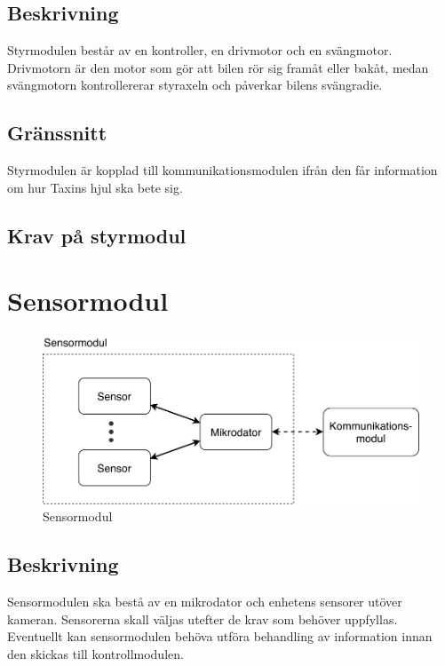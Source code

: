 \documentclass[kravspec/krav.tex]{subfiles}
\begin{document}
\subsection{Beskrivning}
Styrmodulen består av en kontroller, en drivmotor och en svängmotor. Drivmotorn
är den motor som gör att bilen rör sig framåt eller bakåt, medan svängmotorn
kontrollererar styraxeln och påverkar bilens svängradie.

\subsection{Gränssnitt}
Styrmodulen är kopplad till kommunikationsmodulen ifrån den
får information om hur Taxins hjul ska bete sig.

\subsection{Krav på styrmodul}
\begin{reqlist}
\end{reqlist}

\clearpage
\section{Sensormodul}
\begin{figure}[h]
    \centering
    \includegraphics[width=0.6\linewidth]{kravspec/figures/sensormodul.pdf}
    \caption{Sensormodul}
    \label{fig:sensormodul}
\end{figure}

\subsection{Beskrivning}
Sensormodulen ska bestå av en mikrodator och enhetens sensorer utöver kameran.
Sensorerna skall väljas utefter de krav som behöver uppfyllas. Eventuellt kan
sensormodulen behöva utföra behandling av information innan den skickas till
kontrollmodulen.
\end{document}
